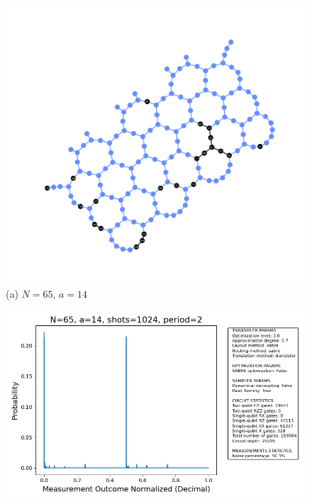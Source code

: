 \documentclass[conference,twoside]{IEEEtran}
\begin{document}
\begin{figure}[!htbp]
\begin{tabular}
\centering
\begin{minipage}{0.1\textwidth}
  \centering
  \includegraphics[width=\textwidth]{ibm_aachen_physical_circuit_layout_N65_a14.png} \\
  \small (a) $N=65$, $a=14$
\end{minipage} 
\begin{minipage}{0.3\textwidth}
  \centering
  \includegraphics[width=\textwidth]{prob_dist_N65_a14_backend_ibmqpu.png} \\
\end{minipage} \\

\end{tabular}
\end{figure}
\end{document}
